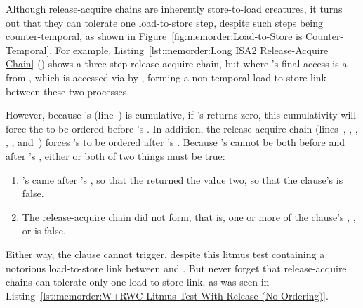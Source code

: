 Although release-acquire chains are inherently store-to-load creatures,
it turns out that they can tolerate one load-to-store step, despite
such steps being counter-temporal, as shown in
Figure~\ref{fig:memorder:Load-to-Store is Counter-Temporal}.
For example,
Listing~\ref{lst:memorder:Long ISA2 Release-Acquire Chain}
()
shows a three-step release-acquire chain, but where 's
final access is a  from , which is
accessed via  by , forming a non-temporal
load-to-store link between these two processes.
\begin{lineref}
However, because 's  (line~)
is cumulative, if 's  returns zero,
this cumulativity will force the  to be ordered
before 's .
In addition, the release-acquire chain
(lines~, , , ,
, and~)
forces 's  to be ordered after 's
.
Because 's  cannot be both before and after
's , either or both of two things must
be true:
\end{lineref}

\begin{enumerate}
\item	{}'s  came after 's
	, so that the  returned
	the value two, so that the  clause's 
	is false.
\item	The release-acquire chain did not form, that is, one or more
	of the  clause's , , or 
	is false.
\end{enumerate}

Either way, the  clause cannot trigger, despite this litmus
test containing a notorious load-to-store link between
 and .
But never forget that release-acquire chains can tolerate only one
load-to-store link, as was seen in
Listing~\ref{lst:memorder:W+RWC Litmus Test With Release (No Ordering)}.

